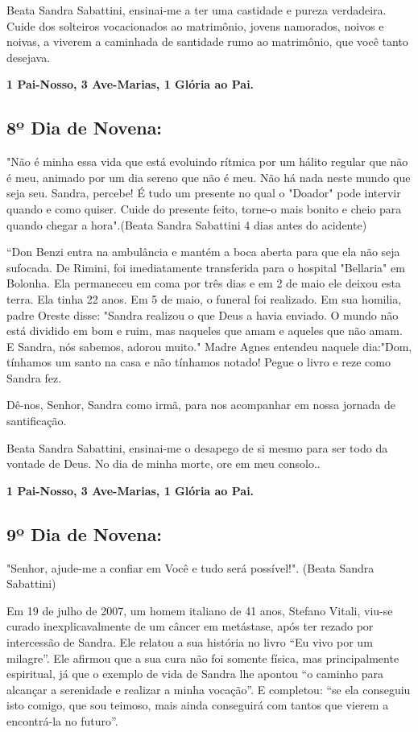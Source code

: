 \documentclass[a4paper,14pt]{extarticle} \usepackage[utf8]{inputenc}
\begin{document}
Beata Sandra Sabattini, ensinai-me a ter uma castidade e pureza verdadeira. Cuide dos solteiros vocacionados ao matrimônio,  jovens namorados, noivos e noivas, a viverem a caminhada de santidade rumo ao matrimônio, que você tanto desejava.


\textbf{1 Pai-Nosso, 3 Ave-Marias,  1 Glória ao Pai.}





\subsection{8º Dia de Novena:} "Não é minha essa vida que está evoluindo rítmica por um hálito regular que não é meu, animado por um dia sereno que não é meu. Não há nada neste mundo que seja seu. Sandra, percebe! É tudo um presente no qual o "Doador" pode intervir quando e como quiser. Cuide do presente feito, torne-o mais bonito e cheio para quando chegar a hora".(Beata Sandra Sabattini 4 dias antes do acidente)

“Don Benzi entra na ambulância e mantém a boca aberta para que ela não seja sufocada. De Rimini, foi imediatamente transferida para o hospital "Bellaria" em Bolonha. Ela permaneceu em coma por três dias e em 2 de maio ele deixou esta terra. Ela tinha 22 anos. Em 5 de maio, o funeral foi realizado. Em sua homilia, padre Oreste disse: "Sandra realizou o que Deus a havia enviado. O mundo não está dividido em bom e ruim, mas naqueles que amam e aqueles que não amam. E Sandra, nós sabemos, adorou muito." Madre Agnes entendeu naquele dia:"Dom, tínhamos um santo na casa e não tínhamos notado! Pegue o livro e reze como Sandra fez.


Dê-nos, Senhor, Sandra como irmã, para nos acompanhar em nossa jornada de santificação.


Beata Sandra Sabattini, ensinai-me o desapego de si mesmo para ser todo da vontade de Deus. No dia de minha morte, ore em meu consolo..


\textbf{1 Pai-Nosso, 3 Ave-Marias,  1 Glória ao Pai.}




\subsection{9º Dia de Novena:} "Senhor, ajude-me a confiar em Você e tudo será possível!". (Beata Sandra Sabattini)

Em 19 de julho de 2007, um homem italiano de 41 anos, Stefano Vitali, viu-se curado inexplicavalmente de um câncer em metástase, após ter rezado por intercessão de Sandra. Ele relatou a sua história no livro “Eu vivo por um milagre”. Ele afirmou que a sua cura não foi somente física, mas principalmente espiritual, já que o exemplo de vida de Sandra lhe apontou “o caminho para alcançar a serenidade e realizar a minha vocação”. E completou: “se ela conseguiu isto comigo, que sou teimoso, mais ainda conseguirá com tantos que vierem a encontrá-la no futuro”.
\end{document}
